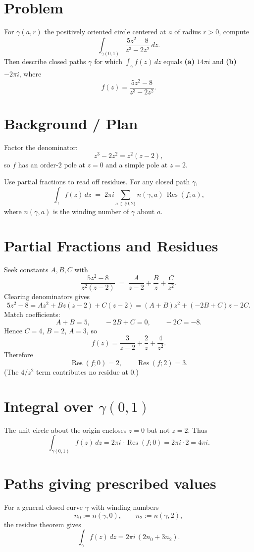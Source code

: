 \documentclass[11pt]{article}
\begin{document}
\section*{Problem}
For $\gamma(a,r)$ the positively oriented circle centered at $a$ of radius $r>0$, compute
\[
\int_{\gamma(0,1)} \frac{5z^{2}-8}{z^{3}-2z^{2}}\,dz.
\]
Then describe closed paths $\gamma$ for which $\displaystyle \int_{\gamma} f(z)\,dz$ equals
\textbf{(a)} $14\pi i$ and \textbf{(b)} $-2\pi i$, where
\[
f(z)=\frac{5z^{2}-8}{z^{3}-2z^{2}}.
\]

\section*{Background / Plan}
Factor the denominator:
\[
z^{3}-2z^{2}=z^{2}(z-2),
\]
so $f$ has an order-$2$ pole at $z=0$ and a simple pole at $z=2$.

Use partial fractions to read off residues. For any closed path $\gamma$,
\[
\int_{\gamma} f(z)\,dz
\;=\;
2\pi i\!\!\sum_{a\in\{0,2\}}\! n(\gamma,a)\,\operatorname{Res}(f;a),
\]
where $n(\gamma,a)$ is the winding number of $\gamma$ about $a$.

\section*{Partial Fractions and Residues}
Seek constants $A,B,C$ with
\[
\frac{5z^{2}-8}{z^{2}(z-2)}
\;=\;
\frac{A}{z-2}+\frac{B}{z}+\frac{C}{z^{2}}.
\]
Clearing denominators gives
\[
5z^{2}-8
=
A z^{2} + B z(z-2) + C(z-2)
=
(A+B)z^{2} + (-2B+C)z - 2C.
\]
Match coefficients:
\[
A+B=5,\qquad -2B+C=0,\qquad -2C=-8.
\]
Hence $C=4$, $B=2$, $A=3$, so
\[
f(z)=\frac{3}{z-2}+\frac{2}{z}+\frac{4}{z^{2}}.
\]
Therefore
\[
\operatorname{Res}(f;0)=2,
\qquad
\operatorname{Res}(f;2)=3.
\]
(The $4/z^{2}$ term contributes no residue at $0$.)

\section*{Integral over $\gamma(0,1)$}
The unit circle about the origin encloses $z=0$ but not $z=2$. Thus
\[
\int_{\gamma(0,1)} f(z)\,dz
=
2\pi i\cdot \operatorname{Res}(f;0)
=
2\pi i\cdot 2
=
\boxed{4\pi i}.
\]

\section*{Paths giving prescribed values}
For a general closed curve $\gamma$ with winding numbers
\[
n_0:=n(\gamma,0),\qquad n_2:=n(\gamma,2),
\]
the residue theorem gives
\[
\int_{\gamma} f(z)\,dz
=
2\pi i\,(2n_0+3n_2).
\]
\end{document}
